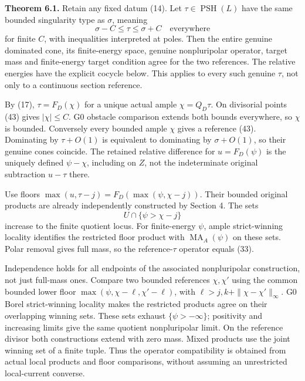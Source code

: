 \documentclass[
  10pt,
]{article}
\begin{document}
\textbf{Theorem 6.1.} Retain any fixed datum (14). Let
\(\tau\in\operatorname{PSH}(L)\) have the same bounded singularity type
as \(\sigma\), meaning
\[\sigma-C\leq\tau\leq\sigma+C\quad\text{everywhere}\tag{43}\] for
finite \(C\), with inequalities interpreted at poles. Then the entire
genuine dominated cone, its finite-energy space, genuine nonpluripolar
operator, target mass and finite-energy target condition agree for the
two references. The relative energies have the explicit cocycle below.
This applies to every such genuine \(\tau\), not only to a continuous
section reference.

By (17), \(\tau=F_D(\chi)\) for a unique actual ample \(\chi=Q_D\tau\).
On divisorial points (43) gives \(|\chi|\leq C\). G0 obstacle comparison
extends both bounds everywhere, so \(\chi\) is bounded. Conversely every
bounded ample \(\chi\) gives a reference (43). Dominating by
\(\tau+O(1)\) is equivalent to dominating by \(\sigma+O(1)\), so their
genuine cones coincide. The retained relative difference for
\(u=F_D(\psi)\) is the uniquely defined \(\psi-\chi\), including on
\(Z\), not the indeterminate original subtraction \(u-\tau\) there.

Use floors \(\max(u,\tau-j)=F_D(\max(\psi,\chi-j))\). Their bounded
original products are already independently constructed by Section 4.
The sets \[U\cap\{\psi>\chi-j\}\] increase to the finite quotient locus.
For finite-energy \(\psi\), ample strict-winning locality identifies the
restricted floor product with \(\operatorname{MA}_A(\psi)\) on these
sets. Polar removal gives full mass, so the reference-\(\tau\) operator
equals (33).

Independence holds for all endpoints of the associated nonpluripolar
construction, not just full-mass ones. Compare two bounded references
\(\chi,\chi'\) using the common bounded lower floor
\(\max(\psi,\chi-\ell,\chi'-\ell)\), with
\(\ell>j,k+\|\chi-\chi'\|_\infty\). G0 Borel strict-winning locality
makes the restricted products agree on their overlapping winning sets.
These sets exhaust \(\{\psi>-\infty\}\); positivity and increasing
limits give the same quotient nonpluripolar limit. On the reference
divisor both constructions extend with zero mass. Mixed products use the
joint winning set of a finite tuple. Thus the operator compatibility is
obtained from actual local products and floor comparisons, without
assuming an unrestricted local-current converse.
\end{document}

